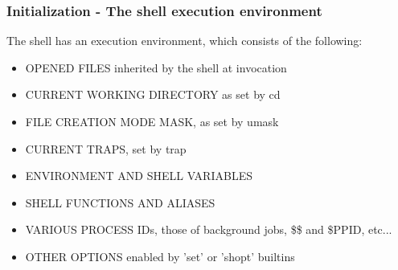 \documentclass[aspectratio=169,10pt]{beamer}
\begin{document}
\begin{frame}
  \frametitle{Initialization - The shell execution environment}

  The shell has an execution environment, which consists of the following:

  \vspace{\baselineskip}

  \begin{itemize}

    \item OPENED FILES inherited by the shell at invocation
    \item CURRENT WORKING DIRECTORY as set by cd
    \item FILE CREATION MODE MASK, as set by umask
    \item CURRENT TRAPS, set by trap
    \item ENVIRONMENT AND SHELL VARIABLES
    \item SHELL FUNCTIONS AND ALIASES
    \item VARIOUS PROCESS IDs, those of background jobs, \$\$ and \$PPID, etc...
    \item OTHER OPTIONS enabled by 'set' or 'shopt' builtins
  \end{itemize}
\end{frame}
\end{document}

